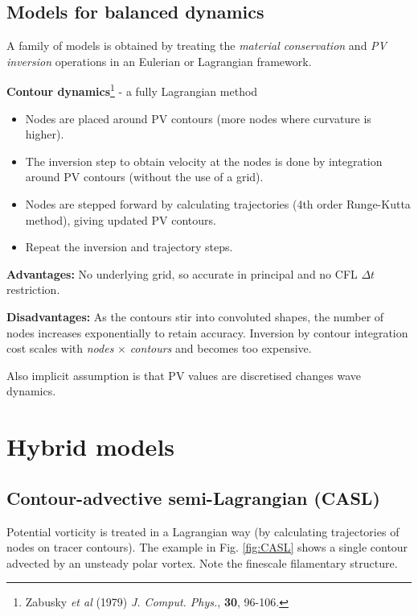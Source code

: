 \subsection{Models for balanced dynamics} 
	
	A family of models is obtained by treating the {\em material
		conservation} and {\em PV inversion} operations in an Eulerian or
	Lagrangian framework.
	
	\vspace{0.5cm}
	{\bf Contour dynamics}\footnote{\BTi
		Zabusky {\em et al} (1979) \emph{J. Comput. Phys.}, {\bf 30},
		96-106.\ETi}
	- a fully Lagrangian method
	
	\begin{itemize}
		\item
		Nodes are placed around PV contours (more nodes where curvature is higher). 
		\item
		The inversion step to obtain velocity at the nodes is done by
		integration around PV contours (without the use of a grid).
		\item
		Nodes are stepped forward by calculating trajectories (4th order
		Runge-Kutta method), giving updated PV contours.
		\item
		Repeat the inversion and trajectory steps.
	\end{itemize}
	
	{\bf Advantages:} No underlying grid, so accurate in principal and no CFL $\Delta t$  restriction.
	
	{\bf Disadvantages:} As the contours stir into convoluted shapes, the
	number of nodes increases exponentially to retain accuracy. Inversion
	by contour integration cost scales with {\em nodes} $\times$ {\em
		contours} and becomes too expensive.
	
	Also implicit assumption is that PV values are discretised changes
	wave dynamics.
	

\section{Hybrid models}
\subsection{Contour-advective semi-Lagrangian (CASL)}
	
			Potential vorticity is treated in a Lagrangian way (by calculating trajectories of nodes on tracer contours).		The example in Fig. \ref{fig:CASL} shows a single contour advected by an unsteady polar vortex. Note the finescale filamentary structure.

